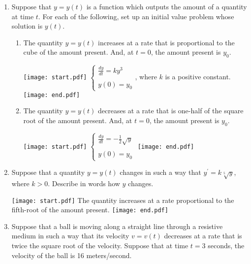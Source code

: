 \documentclass[12pt]{article}
\begin{document}
\begin{enumerate}

\item Suppose that $y=y(t)$ is a function which outputs the amount of a quantity at time $t$. For each of the following, set up an initial value problem whose solution is $y(t)$.

\begin{enumerate}

\item The quantity $y=y(t)$ increases at a rate that is proportional to the cube of the amount present.  And, at $t=0$, the amount present is $y_0$.  

\texttt{[image: start.pdf]}
{{$\left\{\begin{array}{l}
\frac{dy}{dt}=ky^3\\
\\
y(0)=y_0
\end{array}\right.$, where $k$ is a positive constant.}}
\texttt{[image: end.pdf]}


\item The quantity $y=y(t)$ decreases at a rate that is one-half of the square root of the amount present.  And, at $t=0$, the amount present is $y_0$.

\texttt{[image: start.pdf]}
{{$\left\{\begin{array}{l}
\frac{dy}{dt}=-\frac{1}{2}\sqrt{y}\\
\\
y(0)=y_0
\end{array}\right.$}}
\texttt{[image: end.pdf]}


\end{enumerate}

\item Suppose that a quantity $y=y(t)$ changes in such a way that $y^{\prime}=k\sqrt[5]{y}$, where $k>0$.  Describe in words how $y$ changes.

\texttt{[image: start.pdf]}
{{The quantity increases at a rate proportional to the fifth-root of the amount present.}}
\texttt{[image: end.pdf]}


\item Suppose that a ball is moving along a straight line through a resistive medium in such a way that its velocity $v=v(t)$ decreases at a rate that is twice the square root of the velocity.  Suppose that at time $t=3$ seconds, the velocity of the ball is 16 meters/second.

\begin{enumerate}


\end{enumerate}
\end{enumerate}
\end{document}
